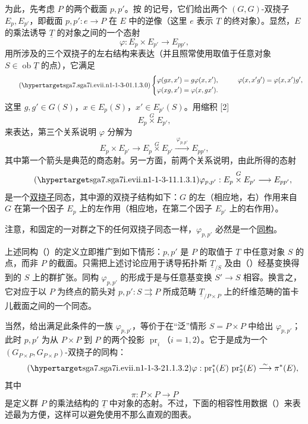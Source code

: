 为此，先考虑 $P$ 的两个截面 $p,p'$。按  的记号，它们给出两个 $(G,G)$-双挠子 $E_p,E_{p'}$，即截面 $p,p':e\longrightarrow P$ 在 $E$ 中的逆像（这里 $e$ 表示 $\underline T$ 的终对象）。显然，$E$ 的乘法诱导 $\underline T$ 的对象之间的一个态射
\[
 \varphi:E_p\times E_{p'}\longrightarrow E_{pp'},
\]
用所涉及的三个双挠子的左右结构来表达（并且照常使用取值于任意对象 $S\in\operatorname{ob}\underline T$ 的点），它满足
\begin{equation}\tag{\SGARefTarget{sga7.sga7i.evii.n1-1-3-0}{1.1.3.0}}
\left\{
\begin{aligned}
 \varphi(gx,x')&=g\varphi(x,x'),
 &\qquad \varphi(x,x'g')&=\varphi(x,x')g',\\
 \varphi(xg,x')&=\varphi(x,gx').
\end{aligned}
\right.
\end{equation}
这里 $g,g'\in G(S)$，$x\in E_p(S)$，$x'\in E_{p'}(S)$。用缩积 [2]
\[
 E_p\mathbin{\overset{G}{\times}}E_{p'},
\]
来表达，第三个关系说明 $\varphi$ 分解为
\[
 E_p\times E_{p'}\longrightarrow
 E_p\mathbin{\overset{G}{\times}}E_{p'}
 \xrightarrow{\ \varphi_{p,p'}\ }E_{pp'},
\]
其中第一个箭头是典范的商态射。另一方面，前两个关系说明，由此所得的态射
\begin{equation}\tag{\SGARefTarget{sga7.sga7i.evii.n1-1-3-1}{1.1.3.1}}
 \varphi_{p,p'}:
 E_p\mathbin{\overset{G}{\times}}E_{p'}\longrightarrow E_{pp'},
\end{equation}
是一个\underline{双挠子}同态，其中源的双挠子结构如下：$G$ 的左（相应地，右）作用来自 $G$ 在第一个因子 $E_p$ 上的左作用（相应地，在第二个因子 $E_{p'}$ 上的右作用）。


注意，和固定的一对群之下的任何双挠子同态一样，$\varphi_{p,p'}$ 必然是一个\underline{同构}。

上述同构（）的定义立即推广到如下情形：$p,p'$ 是 $P$ 的取值于 $\underline T$ 中任意对象 $S$ 的点，而非 $P$ 的截面。只需把上述讨论应用于诱导拓扑斯 $\underline T_{/S}$ 及由（）经基变换得到的 $S$ 上的群扩张。同构 $\varphi_{p,p'}$ 的形成于是与任意基变换 $S'\longrightarrow S$ 相容。换言之，它对应于以 $P$ 为终点的箭头对 $p,p':S\rightrightarrows P$ 所成范畴 $\underline T_{/P\times P}$ 上的纤维范畴的笛卡儿截面之间的一个同态。

当然，给出满足此条件的一族 $\varphi_{p,p'}$，等价于在“泛”情形 $S=P\times P$ 中给出 $\varphi_{p,p'}$；此时 $p,p'$ 为从 $P\times P$ 到 $P$ 的两个投影 $\operatorname{pr}_i$（$i=1,2$）。它于是成为一个 $(G_{P\times P},G_{P\times P})$-双挠子的同构：
\begin{equation}\tag{\SGARefTarget{sga7.sga7i.evii.n1-1-3-2}{1.1.3.2}}
 \varphi:\operatorname{pr}_1^*(E)\,\operatorname{pr}_2^*(E)
 \overset{\sim}{\longrightarrow}\pi^*(E),
\end{equation}
其中
\[
 \pi:P\times P\longrightarrow P
\]
是定义群 $P$ 的乘法结构的 $\underline T$ 中对象的态射。不过，下面的相容性用数据（）来表述最为方便，这样可以避免使用不那么直观的图表。

